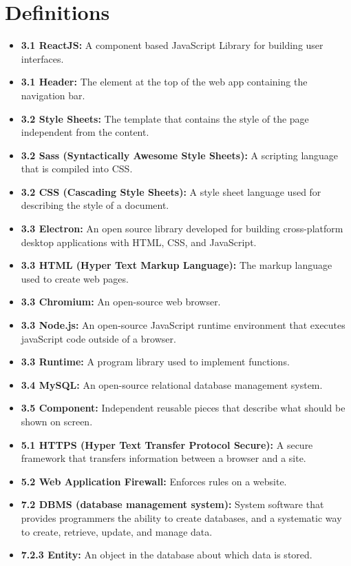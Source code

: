 \documentclass[onecolumn, draftclsnofoot,10pt, compsoc]{IEEEtran}
\begin{document}
\section{Definitions}
\begin{itemize}
    \item \textbf{3.1 ReactJS:} A component based JavaScript Library for building user interfaces. 
    \item \textbf{3.1 Header:} The element at the top of the web app containing the navigation bar.
    \item \textbf{3.2 Style Sheets:} The template that contains the style of the page independent from the content.
    \item \textbf{3.2 Sass (Syntactically Awesome Style Sheets):} A scripting language that is compiled into CSS.
    \item \textbf{3.2 CSS (Cascading Style Sheets):} A style sheet language used for describing the style of a document.
    \item \textbf{3.3 Electron:} An open source library developed for building cross-platform desktop applications with HTML, CSS, and JavaScript.
    \item \textbf{3.3 HTML (Hyper Text Markup Language):} The markup language used to create web pages.
    \item \textbf{3.3 Chromium:} An open-source web browser.
    \item \textbf{3.3 Node.js:} An open-source JavaScript runtime environment that executes javaScript code outside of a browser.
    \item \textbf{3.3 Runtime:} A program library used to implement functions.
    \item \textbf{3.4 MySQL:} An open-source relational database management system.
    \item \textbf{3.5 Component:} Independent reusable pieces that describe what should be shown on screen.
    \item \textbf{5.1 HTTPS (Hyper Text Transfer Protocol Secure):} A secure framework that transfers information between a browser and a site. 
    \item \textbf{5.2 Web Application Firewall:} Enforces rules on a website.
    \item \textbf{7.2 DBMS (database management system):} System software that provides programmers the ability to create databases, and a systematic way to create, retrieve, update, and manage data. 
    \item \textbf{7.2.3 Entity:} An object in the database about which data is stored.
\end{itemize}
    
\end{document}
